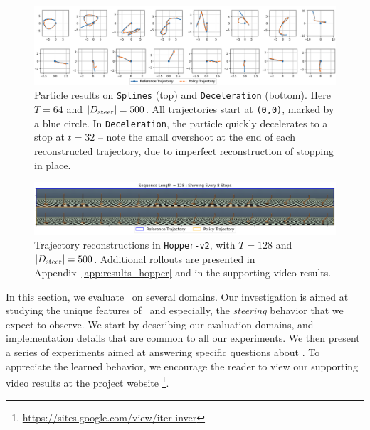 \documentclass[nohyperref]{article}
\begin{document}
\begin{figure}
    \centering
    \includegraphics[width=\textwidth,keepaspectratio]{figures/iclr_plots/particle_combined.png}
    \vspace{-1em}
    \caption{Particle results on \texttt{Splines} (top) and \texttt{Deceleration} (bottom). Here $T=64$ and $|D_{\mathrm{steer}}|=500$. All trajectories start at \texttt{(0,0)}, marked by a blue circle. In \texttt{Deceleration}, the particle quickly decelerates to a stop at $t=32$ -- note the small overshoot at the end of each reconstructed trajectory, due to imperfect reconstruction of stopping in place.}
    \label{fig:particle_all}
\end{figure}
\begin{figure}
    \centering
    \vspace{-1em}
    \includegraphics[width=\textwidth,keepaspectratio]{figures/iclr_plots/hopper-128_one_traj.png}
    \vspace{-2em}
    \caption{
    Trajectory reconstructions in \texttt{Hopper-v2}, with $T=128$ and $|D_{\mathrm{steer}}|=500$. Additional rollouts are presented in Appendix~\ref{app:results_hopper} and in the supporting video results. 
    }
    \label{fig:hopper_128}
    \vspace{-1em}
\end{figure}


In this section, we evaluate \methodname\ on several domains. Our investigation is aimed at studying the unique features of \methodname\, and especially, the \textit{steering} behavior that we expect to observe.
We start by describing our evaluation domains, and implementation details that are common to all our experiments. We then present a series of experiments aimed at answering specific questions about \methodname. To appreciate the learned behavior, we encourage the reader to view our supporting video results at the project website \footnote{\label{foot:website}\url{https://sites.google.com/view/iter-inver}}.
\end{document}
